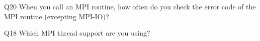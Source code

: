 \begin{description}%
\item{Q20} When you call an MPI routine, how often do you check the error code of the MPI routine  (excepting MPI-IO)?%
\item{Q18} Which MPI thread support are you using?%
\end{description}%
